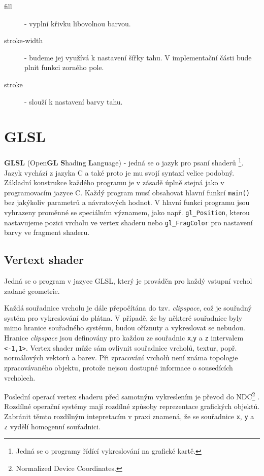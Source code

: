 \begin{description}
	\item[fill]  - vyplní křivku  libovolnou barvou.
	
	\item[stroke-width]  - budeme jej využívá k nastavení šířky tahu. V implementační části bude plnit funkci zorného pole.
	
	\item[stroke]  - slouží k nastavení barvy tahu.
\end{description}




\newpage

\section{GLSL}
\textbf{GLSL} (Open\textbf{GL} \textbf{S}hading \textbf{L}anguage) - jedná se o jazyk pro psaní shaderů \footnote{Jedná se o programy řídící vykreslování na grafické kartě.}. Jazyk vychází z jazyka C a také proto je mu svojí syntaxí velice podobný. Základní konstrukce každého programu je v zásadě úplně stejná jako v programovacím jazyce C. Každý program musí obsahovat hlavní funkcí \texttt{main()} bez jakýkoliv parametrů a návratových hodnot. V hlavní funkci programu jsou vyhrazeny proměnné se speciálním významem, jako např. \texttt{gl\_Position}, kterou nastavujeme  pozici vrcholu ve vertex shaderu nebo \texttt{gl\_FragColor} pro nastavení barvy ve fragment shaderu.

\subsection{Vertext shader}
Jedná se o program v jazyce GLSL, který je prováděn pro každý vstupní vrchol zadané geometrie. 

Každá souřadnice vrcholu je dále přepočítána do tzv. \textit{clipspace}, což je souřadný systém pro vykreslování do plátna. V případě, že by některé souřadnice byly mimo hranice souřadného systému, budou oříznuty a vykreslovat se nebudou. Hranice \textit{clipspace} jsou definovány pro každou ze souřadnic \texttt{x},\texttt{y} a \texttt{z} intervalem \texttt{<-1,1>}. Vertex shader může sám ovlivnit souřadnice vrcholů, textur, popř. normálových vektorů a barev. Při zpracování vrcholů není známa topologie zpracovávaného objektu, protože nejsou dostupné informace o sousedících vrcholech. 

Poslední operací vertex shaderu před samotným vykreslením je převod do NDC\footnote{Normalized Device Coordinates.} \cite{opengl}. Rozdílné operační systémy mají rozdílné způsoby reprezentace grafických objektů. Zabránit těmto rozdílným  intepretacím v praxi znamená, že se souřadnice \texttt{x}, \texttt{y} a \texttt{z} vydělí homogenní souřadnici.

